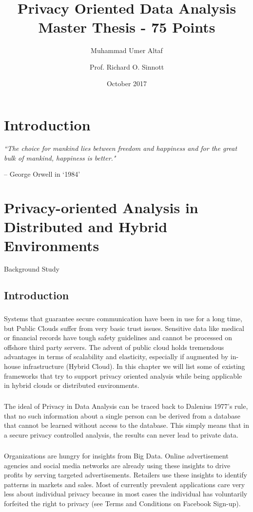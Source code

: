\documentclass[12pt]{report}
\title{Privacy Oriented Data Analysis\\\large{Master Thesis - 75 Points}}
\author[1]{Muhammad Umer Altaf}
\author[1]{Prof. Richard O. Sinnott}
\affil[1]{The University of Melbourne\\School of Computing and Information Systems}
\date{October 2017}
\begin{document}
\maketitle
\setcounter{tocdepth}{1}
\tableofcontents

\chapter{Introduction}


\textit{``The choice for mankind lies between freedom and happiness and for the great bulk of mankind, happiness is better."}

{\raggedleft -- George Orwell in `1984'\quad\par}




\chapter{Privacy-oriented Analysis in Distributed and Hybrid Environments}{Background Study}
\section{Introduction}
\paragraph{}
Systems that guarantee secure communication have been in use for a long time, but Public Clouds suffer from very basic trust issues. Sensitive data like medical or financial records have tough safety guidelines and cannot be processed on offshore third party servers. The advent of public cloud holds tremendous advantages in terms of scalability and elasticity, especially if augmented by in-house infrastructure (Hybrid Cloud). In this chapter we will list some of existing frameworks that try to support privacy oriented analysis while being applicable in hybrid clouds or distributed environments.
\paragraph{}
The ideal of Privacy in Data Analysis can be traced back to Dalenius 1977’s \cite{dalenius1977} rule, that no such information about a single person can be derived from a database that cannot be learned without access to the database. This simply means that in a secure privacy controlled analysis, the results can never lead to private data.
\paragraph{}
Organizations are hungry for insights from Big Data. Online advertisement agencies and social media networks are already using these insights to drive profits by serving targeted advertisements. Retailers use these insights to identify patterns in markets and sales. Most of currently prevalent applications care very less about individual privacy because in most cases the individual has voluntarily forfeited the right to privacy (see Terms and Conditions on Facebook Sign-up).
\end{document}
